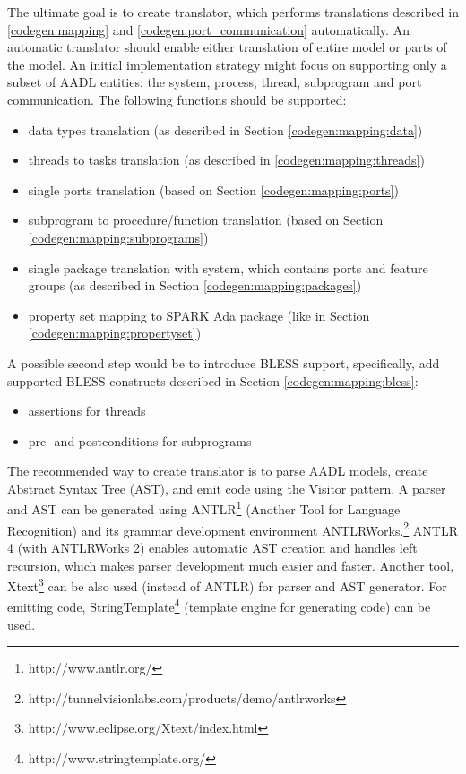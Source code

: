 The ultimate goal is to create translator, which performs translations described in \ref{codegen:mapping} and \ref{codegen:port_communication} automatically. An automatic translator should enable either translation of entire model or parts of the model. An initial implementation strategy might focus on supporting only a subset of AADL entities: the system, process, thread, subprogram and port communication. The following functions should be supported:
\begin{itemize}
	\item data types translation (as described in Section \ref{codegen:mapping:data})
	\item threads to tasks translation (as described in \ref{codegen:mapping:threads})
	\item single ports translation (based on Section \ref{codegen:mapping:ports})
	\item subprogram to procedure/function translation (based on Section \ref{codegen:mapping:subprograms})
	\item single package translation with system, which contains ports and feature groups (as described in Section \ref{codegen:mapping:packages})
	\item property set mapping to SPARK Ada package (like in Section \ref{codegen:mapping:propertyset})
\end{itemize}

A possible second step would be to introduce BLESS support, specifically, add supported BLESS constructs described in Section \ref{codegen:mapping:bless}:
\begin{itemize}
	\item assertions for threads
	\item pre- and postconditions for subprograms
\end{itemize}

The recommended way to create translator is to parse AADL models, create Abstract Syntax Tree (AST), and emit code using the Visitor pattern. A parser and AST can be generated using ANTLR\footnote{http://www.antlr.org/} (Another Tool for Language Recognition) and its grammar development environment ANTLRWorks.\footnote{http://tunnelvisionlabs.com/products/demo/antlrworks} ANTLR 4 (with ANTLRWorks 2) enables automatic AST creation and handles left recursion, which makes parser development much easier and faster. Another tool, Xtext\footnote{http://www.eclipse.org/Xtext/index.html} can be also used (instead of ANTLR) for parser and AST generator. For emitting code, StringTemplate\footnote{http://www.stringtemplate.org/} (template engine for generating code) can be used. 

